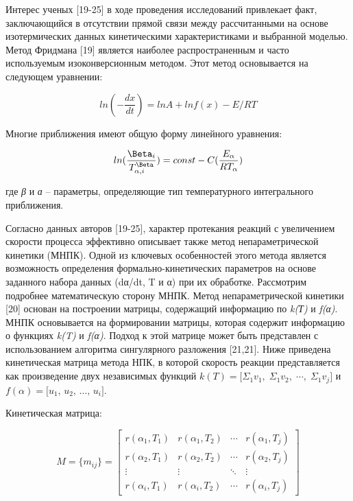 \begin{multicols}{2}
Интерес ученых {[}19-25{]} в ходе проведения исследований привлекает
факт, заключающийся в отсутствии прямой связи между рассчитанными на
основе изотермических данных кинетическими характеристиками и выбранной
моделью. Метод Фридмана {[}19{]} является наиболее распространенным и
часто используемым изоконверсионным методом. Этот метод основывается на
следующем уравнении:

\begin{equation}
ln(-\frac{dx}{dt})=lnA+lnf(x)-E/RT
\end{equation}

Многие приближения имеют общую форму линейного уравнения:

\begin{equation}
ln(\frac{\Beta_i}{T^\Beta_{\alpha,i}})=const-C(\frac{E_\alpha}{RT_\alpha})
\end{equation}

где \emph{β} и \emph{ɑ} -- параметры, определяющие тип температурного
интегрального приближения.

Согласно данных авторов {[}19-25{]}, характер протекания реакций с
увеличением скорости процесса эффективно описывает также метод
непараметрической кинетики (МНПК). Одной из ключевых особенностей этого
метода является возможность определения формально-кинетических
параметров на основе заданного набора данных (dα/dt, T и α) при их
обработке. Рассмотрим подробнее математическую сторону МНПК. Метод
непараметрической кинетики {[}20{]} основан на построении матрицы,
содержащий информацию по \emph{k(Т)} и \emph{f(α)}. МНПК основывается на
формировании матрицы, которая содержит информацию о функциях \emph{k(T)}
и \emph{f(α)}. Подход к этой матрице может быть представлен с
использованием алгоритма сингулярного разложения {[}21,21{]}. Ниже
приведена кинетическая матрица метода НПК, в которой скорость реакции
представляется как произведение двух независимых функций
\(k(T) = \bigl[ \Sigma_{1} v_{1}, \; \Sigma_{1} v_{2}, \; \cdots, \; \Sigma_{1} v_{j} \bigr]\)
и \(f(\alpha) = \bigl[ u_{1},\, u_{2},\, \dots,\, u_{i} \bigr]\).
\end{multicols}

Кинетическая матрица:

\begin{equation}
M = \{ m_{ij} \} =
\begin{bmatrix}
r(\alpha_{1}, T_{1}) & r(\alpha_{1}, T_{2}) & \cdots & r(\alpha_{1}, T_{j}) \\
r(\alpha_{2}, T_{1}) & r(\alpha_{2}, T_{2}) & \cdots & r(\alpha_{2}, T_{j}) \\
\vdots & \vdots & \ddots & \vdots \\
r(\alpha_{i}, T_{1}) & r(\alpha_{i}, T_{2}) & \cdots & r(\alpha_{i}, T_{j})
\end{bmatrix}
\end{equation}

